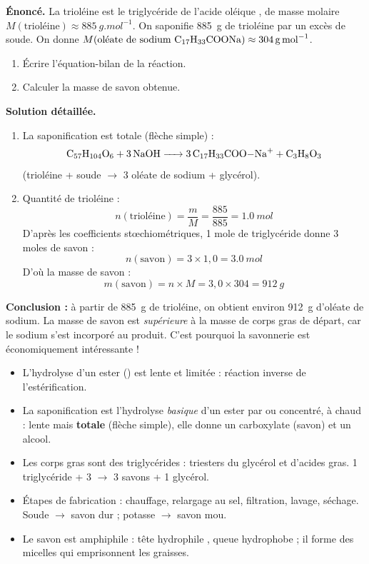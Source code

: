 \documentclass[11pt]{article}
\newcommand{\cle}[1]{{\popxbold\color{popdark}#1}}
\begin{document}
\begin{exoresolu}
\textbf{Énoncé.} La trioléine est le triglycéride de l'acide oléique , de masse molaire $M(\text{trioléine}) \approx \SI{885}{g.mol^{-1}}$. On saponifie \SI{885}{g} de trioléine par un excès de soude. On donne $M(\text{oléate de sodium } \ce{C17H33COONa}) \approx \SI{304}{g.mol^{-1}}$.
\begin{enumerate}
\item Écrire l'équation-bilan de la réaction.
\item Calculer la masse de savon obtenue.
\end{enumerate}
\tcblower
\textbf{Solution détaillée.}
\begin{enumerate}
\item La saponification est totale (flèche simple) :
\[ \ce{C57H104O6 + 3 NaOH -> 3 C17H33COO-Na+ + C3H8O3} \]
(trioléine + soude $\rightarrow$ 3 oléate de sodium + glycérol).
\item Quantité de trioléine :
\[ n(\text{trioléine}) = \frac{m}{M} = \frac{885}{885} = \SI{1,0}{mol} \]
D'après les coefficients stœchiométriques, 1 mole de triglycéride donne 3 moles de savon :
\[ n(\text{savon}) = 3 \times 1,0 = \SI{3,0}{mol} \]
D'où la masse de savon :
\[ m(\text{savon}) = n \times M = 3,0 \times 304 = \SI{912}{g} \]
\end{enumerate}
\textbf{Conclusion :} à partir de \SI{885}{g} de trioléine, on obtient environ \SI{912}{g} d'oléate de sodium. La masse de savon est \emph{supérieure} à la masse de corps gras de départ, car le sodium s'est incorporé au produit. C'est pourquoi la savonnerie est économiquement intéressante !
\end{exoresolu}

\begin{aretenir}
\begin{itemize}
\item L'\cle{hydrolyse} d'un ester () est lente et limitée : réaction inverse de l'estérification.
\item La \cle{saponification} est l'hydrolyse \emph{basique} d'un ester par  ou  concentré, à chaud : lente mais \textbf{totale} (flèche simple), elle donne un carboxylate (savon) et un alcool.
\item Les corps gras sont des \cle{triglycérides} : triesters du glycérol et d'acides gras. 1 triglycéride + 3  $\rightarrow$ 3 savons + 1 glycérol.
\item Étapes de fabrication : chauffage, \cle{relargage} au sel, filtration, lavage, séchage. Soude $\rightarrow$ savon dur ; potasse $\rightarrow$ savon mou.
\item Le savon est \cle{amphiphile} : tête hydrophile , queue hydrophobe  ; il forme des \cle{micelles} qui emprisonnent les graisses.
\end{itemize}
\end{aretenir}
\end{document}
